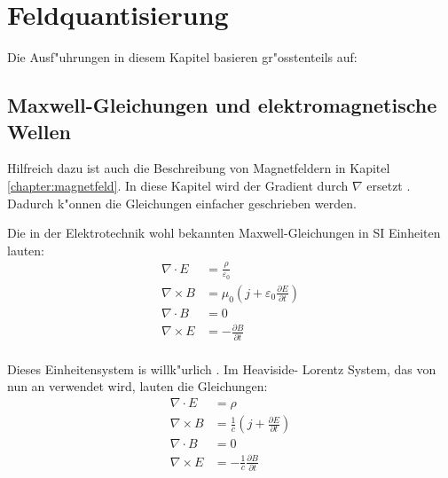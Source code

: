 \chapter{Feldquantisierung\label{chapter:feldquantisierung}}
\begin{refsection}

\printbibliography[heading=subbibliography]
\end{refsection}

Die Ausf"uhrungen in diesem Kapitel basieren gr"osstenteils auf: \cite{fq:aqm}

\section{Maxwell-Gleichungen und elektromagnetische Wellen}

Hilfreich dazu ist auch die Beschreibung von Magnetfeldern in Kapitel \ref{chapter:magnetfeld}. In diese Kapitel wird der Gradient durch $\nabla$ ersetzt \cite{fq:nabla}. Dadurch k"onnen die Gleichungen einfacher geschrieben werden. 

Die in der Elektrotechnik wohl bekannten Maxwell-Gleichungen in SI Einheiten lauten:
\begin{equation}
\begin{split}
\nabla\cdot E &= \frac{\rho}{\varepsilon_0} \\
\nabla\times B &= \mu_0( j  + \varepsilon_0\frac{\partial E}{\partial t}) \\
\nabla\cdot B &=0 \\
\nabla\times E &= -\frac{\partial B }{\partial t}\\
\end{split}
\end{equation}

Dieses Einheitensystem is willk"urlich \cite{fq:em_units}. Im Heaviside-
Lorentz System, das von nun an verwendet wird, lauten die Gleichungen:
\begin{equation}
\begin{split}
\nabla\cdot E &= \rho \\
\nabla\times B &= \frac{1}{c}( j  + \frac{\partial E}{\partial t}) \\
\nabla\cdot B &=0 \\
\nabla\times E &= -\frac{1}{c} \frac{\partial B }{\partial t}\\
\end{split}
\end{equation}

